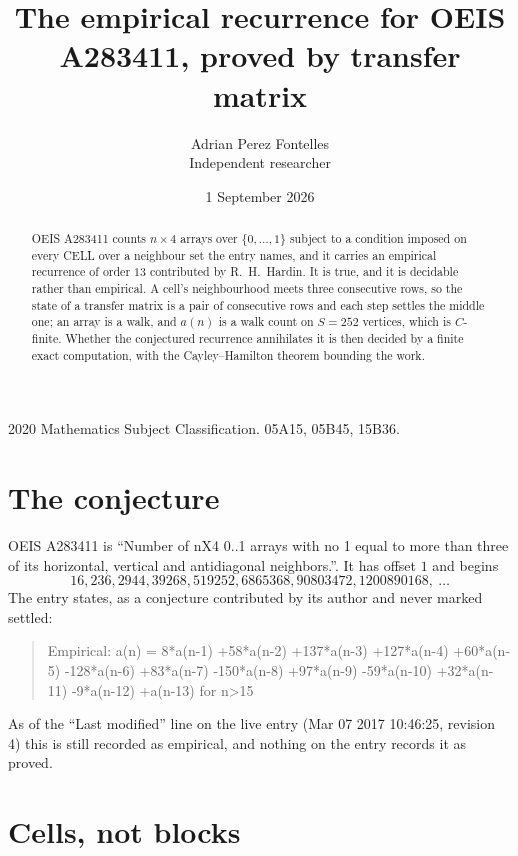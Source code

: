 \documentclass[11pt,a4paper]{article}
\title{The empirical recurrence for OEIS A283411, proved by transfer matrix}
\author{Adrian Perez Fontelles\\ \small Independent researcher}
\date{1 September 2026}
\theoremstyle{plain}
\theoremstyle{definition}
\begin{document}
\maketitle

\begin{abstract}
OEIS A283411 counts $n\times4$ arrays over $\{0,\dots,1\}$ subject to a condition imposed on
every CELL over a neighbour set the entry names, and it carries an empirical recurrence of
order $13$ contributed by R.~H.~Hardin. It is true, and it is decidable rather than
empirical. A cell's neighbourhood meets three consecutive rows, so the state of a transfer
matrix is a pair of consecutive rows and each step settles the middle one; an array is a
walk, and $a(n)$ is a walk count on $S=252$ vertices, which is $C$-finite. Whether the
conjectured recurrence annihilates it is then decided by a finite exact computation, with the
Cayley--Hamilton theorem bounding the work.
\end{abstract}

\noindent\small 2020 Mathematics Subject Classification. 05A15, 05B45, 15B36.\normalsize

\section{The conjecture}

OEIS A283411 is ``Number of nX4 0..1 arrays with no 1 equal to more than three of its horizontal, vertical and antidiagonal neighbors.''. It has offset $1$ and begins
\[
16, 236, 2944, 39268, 519252, 6865368, 90803472, 1200890168,\ \dots
\]
The entry states, as a conjecture contributed by its author and never marked settled:
\begin{quote}
Empirical: a(n) = 8*a(n-1) +58*a(n-2) +137*a(n-3) +127*a(n-4) +60*a(n-5) -128*a(n-6) +83*a(n-7) -150*a(n-8) +97*a(n-9) -59*a(n-10) +32*a(n-11) -9*a(n-12) +a(n-13) for n>15
\end{quote}
As of the ``Last modified'' line on the live entry (Mar 07 2017 10:46:25, revision 4) this is still
recorded as empirical, and nothing on the entry records it as proved.

\section{Cells, not blocks}
\end{document}

